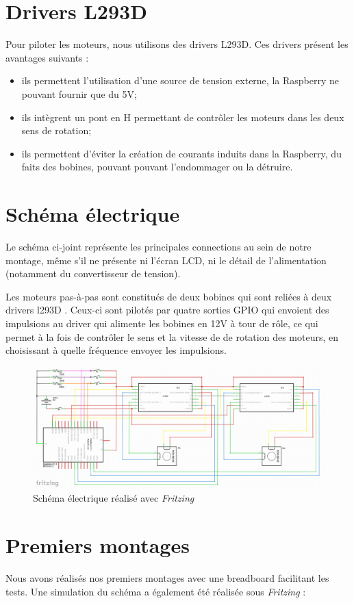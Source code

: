 \documentclass[12pt,a4paper]{report}
\begin{document}
\section{Drivers L293D}
Pour piloter les moteurs, nous utilisons des drivers L293D. Ces drivers présent les avantages suivants :
\begin{itemize}[label=--]
\item ils permettent l'utilisation d'une source de tension externe, la Raspberry ne pouvant fournir que du 5V;
\item ils intègrent un pont en H permettant de contrôler les moteurs dans les deux sens de rotation;
\item ils permettent d'éviter la création de courants induits dans la Raspberry, du faits des bobines, pouvant pouvant l'endommager ou la détruire.
\end{itemize}


\section{Schéma électrique}
Le schéma ci-joint représente les principales connections au sein de notre montage, même s'il ne présente ni l'écran LCD, ni le détail de l'alimentation (notamment du convertisseur de tension).

Les moteurs pas-à-pas sont constitués de deux bobines qui sont reliées à deux drivers l293D . Ceux-ci sont pilotés par quatre sorties GPIO qui envoient des impulsions au driver qui alimente les bobines en 12V à tour de rôle, ce qui permet à la fois de contrôler le sens et la vitesse de de rotation des moteurs, en choisissant à quelle fréquence envoyer les impulsions.
\begin{figure}[!h]
 \center
 \includegraphics[scale=0.33]{../pictures/Sudoku_schema_electrique.png}
 \caption{Schéma électrique réalisé avec \emph{Fritzing}}
\end{figure}

\section{Premiers montages}
Nous avons réalisés nos premiers montages avec une breadboard facilitant les tests. Une simulation du schéma a également été réalisée sous \emph{Fritzing} :
\end{document}
